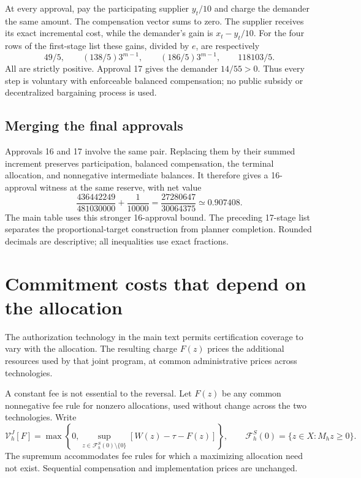\documentclass[ecta,draft,supplement]{econsocart}
\theoremstyle{definition}
\theoremstyle{definition}
\begin{document}
\begin{appendix}
At every approval, pay the participating supplier $y_t/10$ and charge the
demander the same amount. The compensation vector sums to zero. The supplier
receives its exact incremental cost, while the demander's gain is
$x_t-y_t/10$. For the four rows of the first-stage list these gains, divided
by $e$, are respectively
\[
 49/5,\qquad (138/5)3^{m-1},\qquad
 (186/5)3^{m-1},\qquad 118103/5.
\]
All are strictly positive. Approval 17 gives the demander $14/55>0$.
Thus every step is voluntary with enforceable balanced compensation; no public
subsidy or decentralized bargaining process is used.

\subsection{Merging the final approvals}

Approvals 16 and 17 involve the same pair. Replacing them by their summed
increment preserves participation, balanced compensation, the terminal
allocation, and nonnegative intermediate balances. It therefore gives a
16-approval witness at the same reserve, with net value
\[
 \frac{436442249}{481030000}+\frac1{10000}
 =\frac{27280647}{30064375}\simeq0.907408.
\]
The main table uses this stronger 16-approval bound. The preceding 17-stage
list separates the proportional-target construction from planner completion.
Rounded decimals are descriptive; all inequalities use exact fractions.

\section{Commitment costs that depend on the allocation}
\label{sec:allocationfees}

The authorization technology in the main text permits certification coverage
to vary with the allocation. The resulting charge $F(z)$ prices the
additional resources used by that joint program, at common administrative
prices across technologies.

A constant fee is not essential to the reversal. Let $F(z)$ be any common
nonnegative fee rule for nonzero allocations, used without change across the
two technologies. Write
\[
 \mathcal V_h^J[F]=\max\left\{0,
    \sup_{z\in\mathcal F^S_h(0)\setminus\{0\}}
          [W(z)-\tau-F(z)]\right\},
 \qquad
 \mathcal F^S_h(0)=\{z\in X:M_hz\geq0\}.
\]
The supremum accommodates fee rules for which a maximizing allocation need
not exist. Sequential compensation and implementation prices are unchanged.


\end{appendix}
\end{document}
